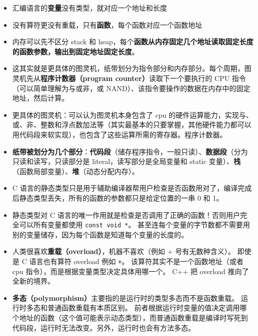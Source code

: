 \begin{itemize}
\item 汇编语言的\textbf{变量}没有类型，就对应一个地址和长度
\item 没有算符更没有重载，只有\textbf{函数}，每个函数对应一个函数地址
\item 内存可以先不区分 stack 和 heap，每个\textbf{函数从内存固定几个地址读取固定长度的函数参数，输出到固定地址固定长度}。
\item 这其实就是更具体的图灵机，纸带划分为指令部分和内存部分。每个周期，图灵机先从\textbf{程序计数器（program counter）}读取下一个要执行的 CPU 指令（可以简单理解为与或非，或 NAND）、该指令要操作的数据在内存中的固定地址，然后计算。
\item 更具体的图灵机：可以认为图灵机本身包含了 cpu 的硬件运算能力，实现与、或、非、整数和浮点数加法等（其实最基本的只要掌握，其他硬件能力都可以用代码段来软实现），也包含了这些运算所需的寄存器。程序计数器。
\item \textbf{纸带被划分为几个部分}：\textbf{代码段}（储存程序指令，一般只读）、\textbf{数据段}（分为只读和读写，只读部分是 literal，读写部分是全局变量和 static 变量）、\textbf{栈}（函数局部变量）、\textbf{堆}（动态分配内存）。
\item C 语言的静态类型只是用于辅助编译器帮用户检查是否函数用对了，编译完成后静态类型丢失，所有的函数的参数都只是给定位置的一串 0 和 1。
\item 静态类型对 C 语言的唯一作用就是检查是否调用了正确的函数！否则用户完全可以所有变量都使用 \verb`const void *`。 甚至连每个变量的字节数都不需要用别的变量储存，因为每个函数是知道每个变量的长度的。
\item 人类很喜欢\textbf{重载（overload）}，机器不喜欢（例如 + 号有无数种含义）。 即使是 C 语言也有算符 overload 例如 \verb`+`。 该算符其实不是一个函数地址（或者 cpu 指令），而是根据变量类型决定具体用哪一个。 C++ 把 overload 推向了全新的境界。
\item \textbf{多态（polymorphism）}主要指的是运行时的类型多态而不是函数重载。 运行时多态和普通函数重载有本质区别。 前者根据运行时变量的值决定调用哪个地址的函数（这个值可能表示动态类型），而普通函数重载是编译时写死到代码段，运行时无法改变。另外，运行时也会有方法多态。
\end{itemize}
